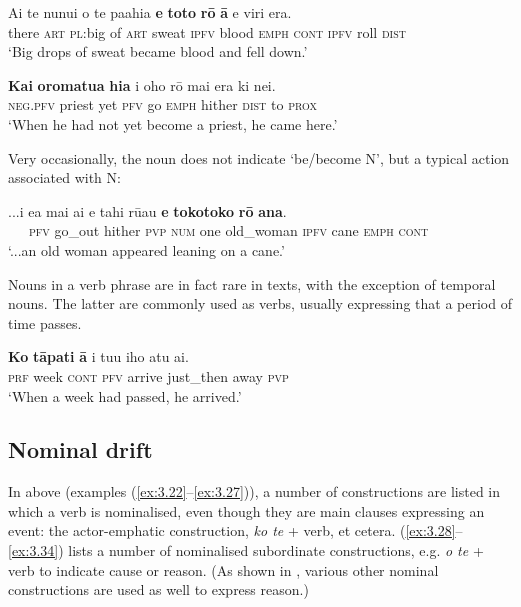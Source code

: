 \ea\label{ex:3.55}
\gll {\ꞌ}Ai te nunui o te pa{\ꞌ}ahia \textbf{e} \textbf{toto} \textbf{rō} \textbf{{\ꞌ}ā} e viri era. \\
there \textsc{art} \textsc{pl}:big of \textsc{art} sweat \textsc{ipfv} blood \textsc{emph} \textsc{cont} \textsc{ipfv} roll \textsc{dist} \\

\glt 
‘Big drops of sweat became blood and fell down.’ \textstyleExampleref{[Luke 22:44]}
\z

\ea\label{ex:3.56}
\gll \textbf{Kai} \textbf{oromatu{\ꞌ}a} \textbf{hia} i oho rō mai era ki nei. \\
\textsc{neg.pfv} priest yet \textsc{pfv} go \textsc{emph} hither \textsc{dist} to \textsc{prox} \\

\glt
‘When he had not yet become a priest, he came here.’ \textstyleExampleref{[R423.004]} 
\z

Very occasionally, the noun does not indicate ‘be/become N’, but a typical action associated with N:

\ea\label{ex:3.57}
\gll ...i e{\ꞌ}a mai ai e tahi rū{\ꞌ}au \textbf{e} \textbf{tokotoko} \textbf{rō} \textbf{{\ꞌ}ana}.\\
~~~\textsc{pfv} go\_out hither \textsc{pvp} \textsc{num} one old\_woman \textsc{ipfv} cane \textsc{emph} \textsc{cont}\\

\glt
‘...an old woman appeared leaning on a cane.’ \textstyleExampleref{[R437.079]} 
\z

Nouns in a verb phrase are in fact rare in texts, with the exception of temporal nouns. The latter are commonly used as verbs, usually expressing that a period of time passes. 

\ea\label{ex:3.58}
\gll \textbf{Ko} \textbf{tāpati} \textbf{{\ꞌ}ā} i tu{\ꞌ}u iho atu ai. \\
\textsc{prf} week \textsc{cont} \textsc{pfv} arrive just\_then away \textsc{pvp} \\

\glt 
‘When a week had passed, he arrived.’ \textstyleExampleref{[R416.515]}\textstyleExampleref{} 
\z
{}
\subsection{Nominal drift}\label{sec:3.2.5}

In  above (examples (\ref{ex:3.22}–\ref{ex:3.27})), a number of constructions are listed in which a verb is nominalised, even though they are main clauses expressing an event: the actor-emphatic construction, \textit{ko te} + verb, et cetera.  (\ref{ex:3.28}–\ref{ex:3.34}) lists a number of nominalised subordinate constructions, e.g. \textit{{\ꞌ}o te} + verb to indicate cause or reason. (As shown in , various other nominal constructions are used as well to express reason.)

